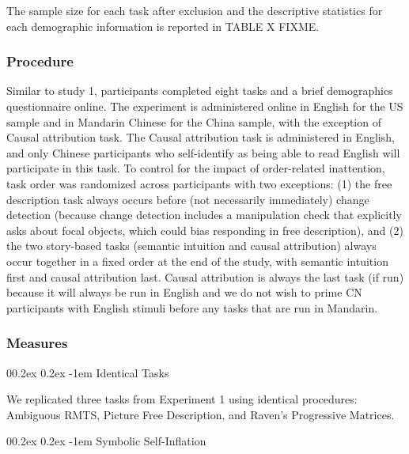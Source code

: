 \documentclass[
  man]{apa6}
\makeatletter
\let\oldparagraph\paragraph
\renewcommand{\paragraph}[1]{\oldparagraph{#1}\mbox{}}
\renewcommand{\paragraph}{\@startsection{paragraph}{4}{\parindent}%
  {0\baselineskip \@plus 0.2ex \@minus 0.2ex}%
  {-1em}%
  {\normalfont\normalsize\bfseries\itshape\typesectitle}}
\makeatother
\begin{document}
The sample size for each task after exclusion and the descriptive statistics for each demographic information is reported in TABLE X FIXME.

\hypertarget{procedure-1}{%
\subsubsection{Procedure}\label{procedure-1}}

Similar to study 1, participants completed eight tasks and a brief demographics questionnaire online. The experiment is administered online in English for the US sample and in Mandarin Chinese for the China sample, with the exception of Causal attribution task. The Causal attribution task is administered in English, and only Chinese participants who self-identify as being able to read English will participate in this task. To control for the impact of order-related inattention, task order was randomized across participants with two exceptions: (1) the free description task always occurs before (not necessarily immediately) change detection (because change detection includes a manipulation check that explicitly asks about focal objects, which could bias responding in free description), and (2) the two story-based tasks (semantic intuition and causal attribution) always occur together in a fixed order at the end of the study, with semantic intuition first and causal attribution last. Causal attribution is always the last task (if run) because it will always be run in English and we do not wish to prime CN participants with English stimuli before any tasks that are run in Mandarin.

\hypertarget{measures-1}{%
\subsubsection{Measures}\label{measures-1}}

\hypertarget{identical-tasks}{%
\paragraph{Identical Tasks}\label{identical-tasks}}

We replicated three tasks from Experiment 1 using identical procedures: Ambiguous RMTS, Picture Free Description, and Raven's Progressive Matrices.

\hypertarget{symbolic-self-inflation-2}{%
\paragraph{Symbolic Self-Inflation}\label{symbolic-self-inflation-2}}
\end{document}
